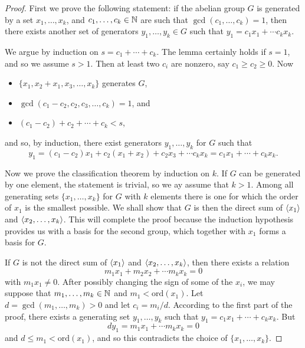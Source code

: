 \begin{proof}
    First we prove the following statement: if the abelian group $G$ is generated by a set $x_1,\ldots,x_k$, and $c_1,\ldots,c_k\in\mathbb{N}$ are such that $\gcd(c_1,\ldots,c_k)=1$, then there exists another set of generators $y_1,\ldots,y_k\in G$ such that $y_1=c_1x_1+\cdots c_kx_k$.

    We argue by induction on $s=c_1+\cdots+c_k$. The lemma certainly holds if $s=1$, and so we assume $s>1$. Then at least two $c_i$ are nonzero, say $c_1\geq c_2\geq 0$. Now
    \begin{itemize}
        \item $\{x_1,x_2+x_1,x_3,\ldots,x_k\}$ generates $G$,
        \item $\gcd(c_1-c_2,c_2,c_3,\ldots,c_k)=1$, and
        \item $(c_1-c_2)+c_2+\cdots+c_k<s$,
    \end{itemize}
    and so, by induction, there exist generators $y_1,\ldots, y_k$ for $G$ such that
    \[y_1=(c_1-c_2)x_1+c_2(x_1+x_2)+c_2x_3+\cdots c_kx_k=c_1x_1+\cdots +c_kx_k.\]

    Now we prove the classification theorem by induction on $k$. If $G$ can be generated by one element, the statement is trivial, so we ay assume that $k>1$. Among all generating sets $\{x_1,\ldots,x_k\}$ for $G$ with $k$ elements there is one for which the order of $x_1$ is the smallest possible. We shall show that $G$ is then the direct sum of $\langle x_1\rangle$ and $\langle x_2,\ldots,x_k\rangle$. This will complete the proof because the induction hypothesis provides us with a basis for the second group, which together with $x_1$ forms a basis for $G$.

    If $G$ is not the direct sum of $\langle x_1\rangle$ and $\langle x_2,\ldots,x_k\rangle$, then there exists a relation
    \[m_1x_1+m_2x_2+\cdots m_kx_k=0\]
    with $m_1x_1\neq 0$. After possibly changing the sign of some of the $x_i$, we may suppose that $m_1,\ldots,m_k\in\mathbb{N}$ and $m_1<\mathrm{ord}(x_1)$. Let $d=\gcd(m_1,\ldots,m_k)>0$ and let $c_i=m_i/d$. According to the first part of the proof, there exists a generating set $y_1,\ldots,y_k$ such that $y_1=c_1x_1+\cdots+c_kx_k$. But 
    \[dy_1=m_1x_1+\cdots m_kx_k=0\]
    and $d\leq m_1<\mathrm{ord}(x_1)$, and so this contradicts the choice of $\{x_1,\ldots,x_k\}$.
\end{proof}
